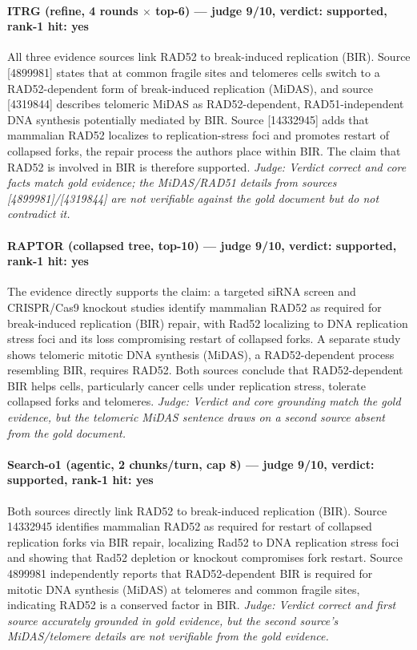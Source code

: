 \documentclass[sigconf, review, anonymous]{acmart}
\begin{document}
\paragraph{ITRG (refine, 4 rounds $\times$ top-6) --- judge 9/10, verdict: supported, rank-1 hit: yes}
\noindent All three evidence sources link RAD52 to break-induced replication (BIR). Source [4899981] states that at common fragile sites and telomeres cells switch to a RAD52-dependent form of break-induced replication (MiDAS), and source [4319844] describes telomeric MiDAS as RAD52-dependent, RAD51-independent DNA synthesis potentially mediated by BIR. Source [14332945] adds that mammalian RAD52 localizes to replication-stress foci and promotes restart of collapsed forks, the repair process the authors place within BIR. The claim that RAD52 is involved in BIR is therefore supported.
\noindent\small\textit{Judge: Verdict correct and core facts match gold evidence; the MiDAS/RAD51 details from sources [4899981]/[4319844] are not verifiable against the gold document but do not contradict it.}
\paragraph{RAPTOR (collapsed tree, top-10) --- judge 9/10, verdict: supported, rank-1 hit: yes}
\noindent The evidence directly supports the claim: a targeted siRNA screen and CRISPR/Cas9 knockout studies identify mammalian RAD52 as required for break-induced replication (BIR) repair, with Rad52 localizing to DNA replication stress foci and its loss compromising restart of collapsed forks. A separate study shows telomeric mitotic DNA synthesis (MiDAS), a RAD52-dependent process resembling BIR, requires RAD52. Both sources conclude that RAD52-dependent BIR helps cells, particularly cancer cells under replication stress, tolerate collapsed forks and telomeres.
\noindent\small\textit{Judge: Verdict and core grounding match the gold evidence, but the telomeric MiDAS sentence draws on a second source absent from the gold document.}
\paragraph{Search-o1 (agentic, 2 chunks/turn, cap 8) --- judge 9/10, verdict: supported, rank-1 hit: yes}
\noindent Both sources directly link RAD52 to break-induced replication (BIR). Source 14332945 identifies mammalian RAD52 as required for restart of collapsed replication forks via BIR repair, localizing Rad52 to DNA replication stress foci and showing that Rad52 depletion or knockout compromises fork restart. Source 4899981 independently reports that RAD52-dependent BIR is required for mitotic DNA synthesis (MiDAS) at telomeres and common fragile sites, indicating RAD52 is a conserved factor in BIR.
\noindent\small\textit{Judge: Verdict correct and first source accurately grounded in gold evidence, but the second source's MiDAS/telomere details are not verifiable from the gold evidence.}
\end{document}
